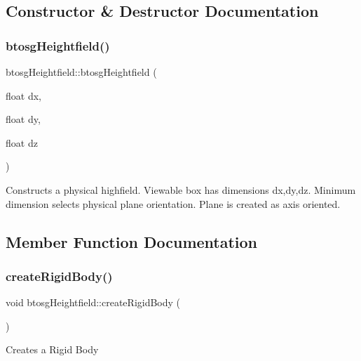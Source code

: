 \subsection{Constructor \& Destructor Documentation}
\mbox{\label{classbtosgHeightfield_a535e1a7b47bb279fdfa0d6d6826251ab}} 
\subsubsection{\texorpdfstring{btosgHeightfield()}{btosgHeightfield()}}
{\footnotesize\ttfamily btosg\+Heightfield\+::btosg\+Heightfield (\begin{DoxyParamCaption}\item[{float}]{dx,  }\item[{float}]{dy,  }\item[{float}]{dz }\end{DoxyParamCaption})\hspace{0.3cm}{\ttfamily [inline]}}

Constructs a physical highfield. Viewable box has dimensions dx,dy,dz. Minimum dimension selects physical plane orientation. Plane is created as axis oriented. 

\subsection{Member Function Documentation}
\mbox{\label{classbtosgHeightfield_a9f44ffd7e820af4a3dc4b6cc036bda36}} 
\subsubsection{\texorpdfstring{createRigidBody()}{createRigidBody()}}
{\footnotesize\ttfamily void btosg\+Heightfield\+::create\+Rigid\+Body (\begin{DoxyParamCaption}{ }\end{DoxyParamCaption})\hspace{0.3cm}{\ttfamily [inline]}}

Creates a Rigid Body \mbox{\label{classbtosgObject_a2019ec63bde02b72600450c7c985e77a}} 
